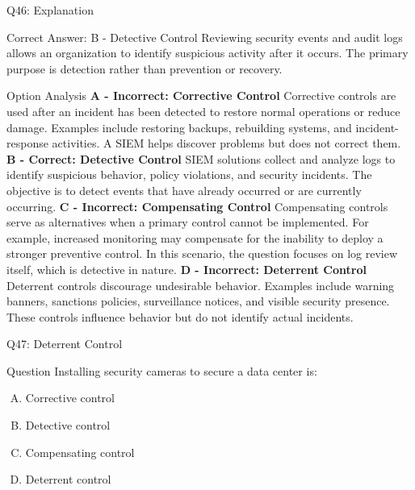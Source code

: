 \documentclass{beamer}
\begin{document}
	 \begin{frame}[shrink=10]{Q46: Explanation} \begin{block}{Correct Answer: B - Detective Control} Reviewing security events and audit logs allows an organization to identify suspicious activity after it occurs. The primary purpose is detection rather than prevention or recovery. \end{block} \begin{block}{Option Analysis} \textbf{A - Incorrect: Corrective Control} Corrective controls are used after an incident has been detected to restore normal operations or reduce damage. Examples include restoring backups, rebuilding systems, and incident-response activities. A SIEM helps discover problems but does not correct them. \vspace{0.15cm} \textbf{B - Correct: Detective Control} SIEM solutions collect and analyze logs to identify suspicious behavior, policy violations, and security incidents. The objective is to detect events that have already occurred or are currently occurring. \vspace{0.15cm} \textbf{C - Incorrect: Compensating Control} Compensating controls serve as alternatives when a primary control cannot be implemented. For example, increased monitoring may compensate for the inability to deploy a stronger preventive control. In this scenario, the question focuses on log review itself, which is detective in nature. \vspace{0.15cm} \textbf{D - Incorrect: Deterrent Control} Deterrent controls discourage undesirable behavior. Examples include warning banners, sanctions policies, surveillance notices, and visible security presence. These controls influence behavior but do not identify actual incidents. \end{block}  \end{frame}
	
	
	\begin{frame}{Q47: Deterrent Control}
		\begin{block}{Question}
			Installing security cameras to secure a data center is:
		\end{block}
		\begin{enumerate}[(A)]
			\item Corrective control
			\item Detective control
			\item Compensating control
			\item Deterrent control
		\end{enumerate}
	\end{frame}
	
\end{document}
